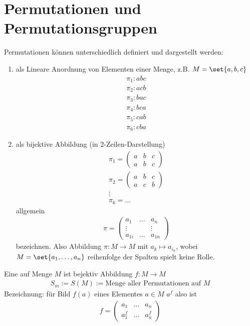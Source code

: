 \section{Permutationen und Permutationsgruppen}
Permutationen können unterschiedlich definiert und dargestellt werden:
\begin{enumerate}
	\item als Lineare Anordnung von Elementen einer Menge, z.B. $M = \set{a,b,c}$
	\begin{align*}
		\pi_1\colon abc\\
		\pi_2 \colon acb\\
		\pi_3 \colon bac\\
		\pi_4 \colon bca\\
		\pi_5 \colon cab\\
		\pi_6\colon cba
	\end{align*}
	\item als bijektive Abbildung (in 2-Zeilen-Darstellung)
	\begin{align*}
		\pi_1 = \begin{pmatrix}
			a & b & c\\
			a & b & c
		\end{pmatrix}\\
	\pi_2 = \begin{pmatrix}
		a & b & c\\
		a & c & b
	\end{pmatrix}\\
	\vdots\\
	\pi_6 = ...
	\end{align*}
	allgemein
	\begin{align*}
		\pi = \begin{pmatrix}
			a_1 & \dots &a_n\\
			\vdots & & \vdots\\
			a_{1i} & \dots & a_{1n}
		\end{pmatrix}
	\end{align*}
	bezeichnen. Also Abbildung $\pi \colon M \to M$ mit $a_k \mapsto a_{i_k}$, wobei $M = \set{a_1, \dots, a_n}$ reihenfolge der Spalten spielt keine Rolle.
\end{enumerate}
\begin{definition}
	Eine  auf Menge $M$ ist bejektiv Abbildung $f \colon M \to M$
	\begin{align*}
		S_m := S(M) := \text{Menge aller Permutationen auf }M
	\end{align*}
	Bezeichnung: für Bild $f(a)$ eines Elementes $a \in M$ $a^f$ also ist
	\begin{align*}
		f = \begin{pmatrix}
			a_1 & \dots & a_n\\
			a^f_1 &\dots & a^f_n
		\end{pmatrix}
	\end{align*}
\end{definition}
